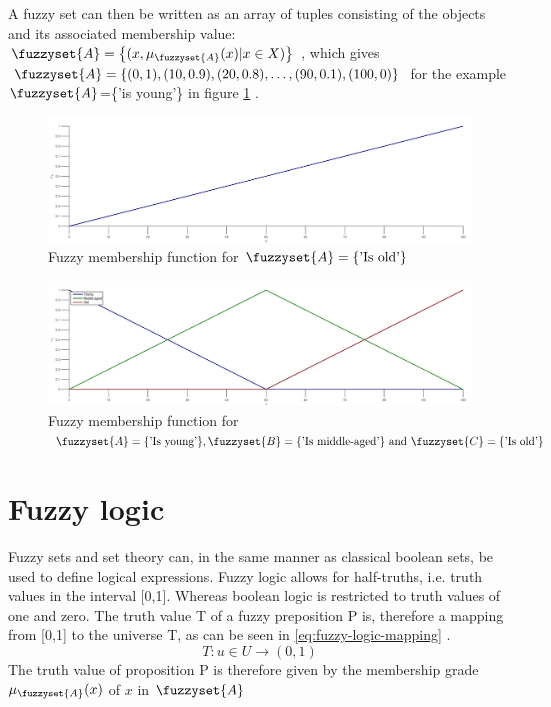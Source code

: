 A fuzzy set can then be written as an array of tuples consisting of the objects and its associated membership value: $\fuzzyset{A}=\left \{(x,\mu_{\fuzzyset{A}}(x)|x \in X) \right \}$ \cite{zimmermann2010fuzzy}, which gives \\ $\fuzzyset{A}=\left \{(0,1),(10,0.9),(20,0.8),\dots,(90,0.1),(100,0) \right \}$ for the example $\fuzzyset{A}$=\{'is young'\} in figure \ref{fig:FMF_ex} \cite{ross2009fuzzy}.
\begin{figure}
    \centering
    \includegraphics[width=\textwidth]{FMF_ex}
    \caption{Fuzzy membership function for $\protect\fuzzyset{A}=\left \{ \text{'Is old'} \right \}$}
    \label{fig:FMF_ex}
\end{figure}

\begin{figure}
    \centering
    \includegraphics[width=\textwidth]{FMF_ex2}
    \caption{Fuzzy membership function for $\protect\fuzzyset{A}=\{\text{'Is young'}\}, \protect\fuzzyset{B}=\{\text{'Is middle-aged'\}}\text{ and }\protect\fuzzyset{C}=\{\text{'Is old'}\}$}
    \label{fig:FMF_ex2}
\end{figure}
\section{Fuzzy logic}
Fuzzy sets and set theory can, in the same manner as classical boolean sets, be used to define logical expressions. Fuzzy logic allows for half-truths, i.e. truth values in the interval [0,1]. Whereas boolean logic is restricted to truth values of one and zero. The truth value T of a fuzzy preposition P is, therefore a mapping from [0,1] to the universe T, as can be seen in \ref{eq:fuzzy-logic-mapping} \cite{ross2009fuzzy}.
\begin{equation}
    T:u\in U\rightarrow (0,1)
    \label{eq:fuzzy-logic-mapping}
\end{equation}
The truth value of proposition P is therefore given by the membership grade $\mu_{\fuzzyset{A}}(x)$ of $x$ in $\fuzzyset{A}$

